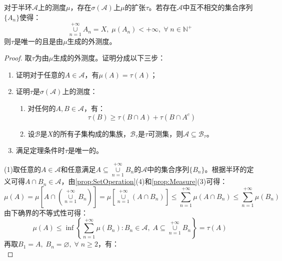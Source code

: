 \begin{theorem}\label{theo:SemiringMeasureExtension}
	对于半环$\mathscr{A}$上的测度$\mu$，存在$\sigma(\mathscr{A})$上$\mu$的扩张$\tau$。若存在$\mathscr{A}$中互不相交的集合序列$\{A_n\}$使得：
	\begin{equation*}
		\underset{n=1}{\overset{+\infty}{\cup}}A_n=X,\;\mu(A_n)<+\infty,\;\forall\;n\in\mathbb{N}^+
	\end{equation*}
	则$\tau$是唯一的且是由$\mu$生成的外测度。
\end{theorem}
\begin{proof}
	取$\tau$为由$\mu$生成的外测度。证明分成以下三步：
	\begin{enumerate}
		\item 证明对于任意的$A\in \mathscr{A}$，有$\mu(A)=\tau(A)$；
		\item 证明$\tau$是$\sigma(\mathscr{A})$上的测度：
		\begin{enumerate}
			\item 对任何的$A,B\in \mathscr{A}$，有：
			\begin{equation*}
				\tau(B)\geqslant\tau(B\cap A)+\tau(B\cap A^c)
			\end{equation*}
			\item 设$\mathscr{B}$是$X$的所有子集构成的集族，$\mathscr{B}_{\tau}$是$\tau$可测集，则$\mathscr{A}\subseteq\mathscr{B}_{\tau}$。
		\end{enumerate}
		\item 满足定理条件时$\tau$是唯一的。
	\end{enumerate}\par
	(1)取任意的$A\in \mathscr{A}$和任意满足$A\subseteq\underset{n=1}{\overset{+\infty}{\cup}}B_n$的$\mathscr{A}$中的集合序列$\{B_n\}$。根据半环的定义可得$A\cap B_n\in\mathscr{A}$，由\cref{prop:SetOperation}(4)和\cref{prop:Measure}(3)可得：
	\begin{equation*}
		\mu(A)=\mu\left[A\cap\left(\underset{n=1}{\overset{+\infty}{\cup}}B_n\right)\right]=\mu\left[\underset{n=1}{\overset{+\infty}{\cup}}(A\cap B_n)\right]\leqslant\sum_{n=1}^{+\infty}\mu(A\cap B_n)\leqslant\sum_{n=1}^{+\infty}\mu(B_n)
	\end{equation*}
	由下确界的不等式性可得：
	\begin{equation*}
		\mu(A)\leqslant\inf\left\{\sum_{n=1}^{+\infty}\mu(B_n):B_n\in\mathscr{A},\;A\subseteq\underset{n=1}{\overset{+\infty}{\cup}}B_n\right\}=\tau(A)
	\end{equation*}
	再取$B_1=A,\;B_n=\varnothing,\;\forall\;n\geqslant2$，有：
	\begin{equation*}

\end{equation*}
\end{proof}

